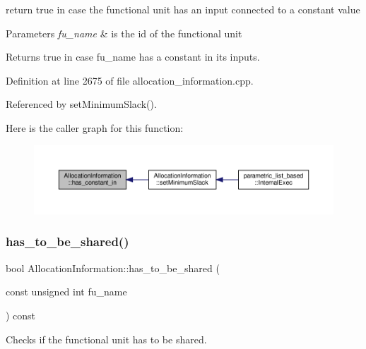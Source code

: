 return true in case the functional unit has an input connected to a constant value 


\begin{DoxyParams}{Parameters}
{\em fu\+\_\+name} & is the id of the functional unit \\
\hline
\end{DoxyParams}
\begin{DoxyReturn}{Returns}
true in case fu\+\_\+name has a constant in its inputs. 
\end{DoxyReturn}


Definition at line 2675 of file allocation\+\_\+information.\+cpp.



Referenced by set\+Minimum\+Slack().

Here is the caller graph for this function\+:
\nopagebreak
\begin{figure}[H]
\begin{center}
\leavevmode
\includegraphics[width=350pt]{d7/d79/classAllocationInformation_a7ac88f38f763c08036251efa88ba041b_icgraph}
\end{center}
\end{figure}
\mbox{\label{classAllocationInformation_a5e6a222a22d684b14f1a2b42eb3b2696}} 
\subsubsection{\texorpdfstring{has\+\_\+to\+\_\+be\+\_\+shared()}{has\_to\_be\_shared()}}
{\footnotesize\ttfamily bool Allocation\+Information\+::has\+\_\+to\+\_\+be\+\_\+shared (\begin{DoxyParamCaption}\item[{const unsigned int}]{fu\+\_\+name }\end{DoxyParamCaption}) const}



Checks if the functional unit has to be shared. 


